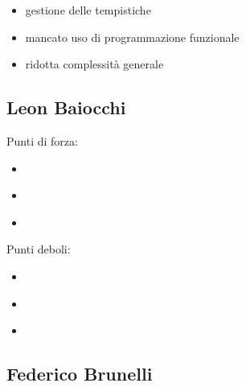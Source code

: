 \begin{itemize}
	\item gestione delle tempistiche
	\item mancato uso di programmazione funzionale
	\item ridotta complessità generale
\end{itemize}


\subsection*{Leon Baiocchi}


\begin{flushleft}
	
\textsf{\small Punti di forza:}\\

\begin{itemize}
	\item \textsf{\small } %
	\item \textsf{\small }
	\item \textsf{\small }
\end{itemize}

\textsf{\small Punti deboli: }\\

\begin{itemize}
	\item \textsf{\small } %
	\item \textsf{\small }
	\item \textsf{\small }
\end{itemize}

\end{flushleft}



\subsection*{Federico Brunelli}


